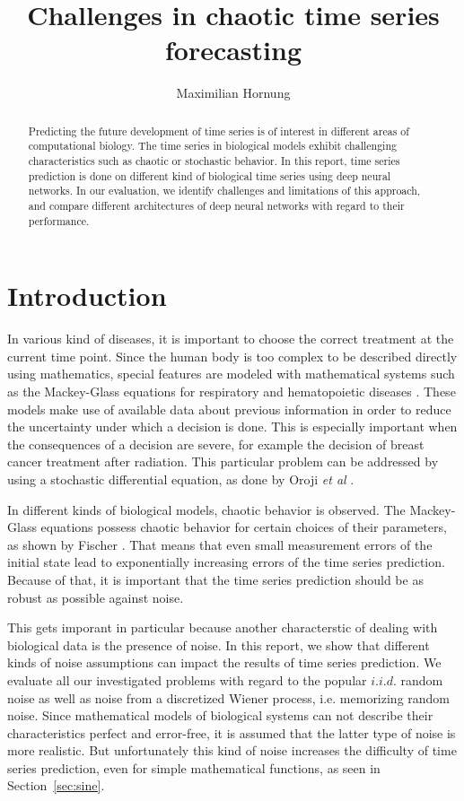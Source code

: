 \documentclass{article}
\title{Challenges in chaotic time series forecasting}
\author{Maximilian Hornung}
\begin{document}
\maketitle 

\begin{abstract}
  Predicting the future development of time series is of interest in different
  areas of computational biology. The time series in biological models exhibit
  challenging characteristics such as chaotic or stochastic behavior. In this
  report, time series prediction is done on different kind of biological time
  series using deep neural networks. In our evaluation, we identify challenges
  and limitations of this approach, and compare different architectures of
  deep neural networks with regard to their performance.
\end{abstract}

\section{Introduction}

In various kind of diseases, it is important to choose the correct treatment at
the current time point. Since the human body is too complex to be described
directly using mathematics, special features are modeled with mathematical
systems such as the Mackey-Glass equations for respiratory and hematopoietic
diseases \cite{mackey1977}. These models make use of available data about
previous information in order to reduce the uncertainty under which a decision
is done. This is especially important when the consequences of a decision are
severe, for example the decision of breast cancer treatment after radiation.
This particular problem can be addressed by using a stochastic differential
equation, as done by Oroji \textit{et al} \cite{oroji2016}.

In different kinds of biological models, chaotic behavior is observed. The
Mackey-Glass equations possess chaotic behavior for certain choices of their
parameters, as shown by Fischer \cite{farmer1982}. That means that even small
measurement errors of the initial state lead to exponentially increasing
errors of the time series prediction. Because of that, it is important
that the time series prediction should be as robust as possible against noise.

This gets imporant in particular because another characterstic of dealing with
biological data is the presence of noise. In
this report, we show that different kinds of noise assumptions can impact the
results of time series prediction. We evaluate all our investigated problems
with regard to the popular $i.i.d.$ random noise as well as noise from a 
discretized Wiener process, i.e. memorizing random
noise. Since mathematical models of biological systems can not describe their
characteristics perfect and error-free, it is assumed that the latter type of
noise is more realistic. But unfortunately this kind of noise increases the
difficulty of time series prediction, even for simple mathematical functions,
as seen in Section~\ref{sec:sine}.
\end{document}
